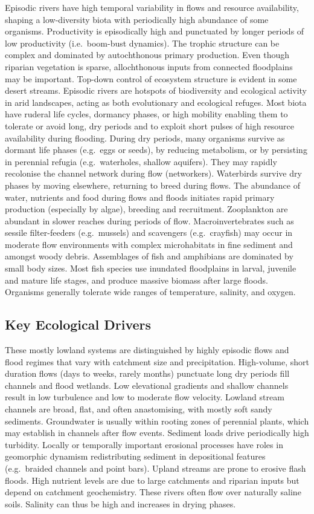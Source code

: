 \documentclass[
  letterpaper,
  DIV=11,
  numbers=noendperiod]{scrartcl}
\begin{document}
Episodic rivers have high temporal variability in flows and resource
availability, shaping a low-diversity biota with periodically high
abundance of some organisms. Productivity is episodically high and
punctuated by longer periods of low productivity (i.e.~boom-bust
dynamics). The trophic structure can be complex and dominated by
autochthonous primary production. Even though riparian vegetation is
sparse, allochthonous inputs from connected floodplains may be
important. Top-down control of ecosystem structure is evident in some
desert streams. Episodic rivers are hotspots of biodiversity and
ecological activity in arid landscapes, acting as both evolutionary and
ecological refuges. Most biota have ruderal life cycles, dormancy
phases, or high mobility enabling them to tolerate or avoid long, dry
periods and to exploit short pulses of high resource availability during
flooding. During dry periods, many organisms survive as dormant life
phases (e.g.~eggs or seeds), by reducing metabolism, or by persisting in
perennial refugia (e.g.~waterholes, shallow aquifers). They may rapidly
recolonise the channel network during flow (networkers). Waterbirds
survive dry phases by moving elsewhere, returning to breed during flows.
The abundance of water, nutrients and food during flows and floods
initiates rapid primary production (especially by algae), breeding and
recruitment. Zooplankton are abundant in slower reaches during periods
of flow. Macroinvertebrates such as sessile filter-feeders
(e.g.~mussels) and scavengers (e.g.~crayfish) may occur in moderate flow
environments with complex microhabitats in fine sediment and amongst
woody debris. Assemblages of fish and amphibians are dominated by small
body sizes. Most fish species use inundated floodplains in larval,
juvenile and mature life stages, and produce massive biomass after large
floods. Organisms generally tolerate wide ranges of temperature,
salinity, and oxygen.

\subsection{Key Ecological Drivers}\label{key-ecological-drivers-5}

These mostly lowland systems are distinguished by highly episodic flows
and flood regimes that vary with catchment size and precipitation.
High-volume, short duration flows (days to weeks, rarely months)
punctuate long dry periods fill channels and flood wetlands. Low
elevational gradients and shallow channels result in low turbulence and
low to moderate flow velocity. Lowland stream channels are broad, flat,
and often anastomising, with mostly soft sandy sediments. Groundwater is
usually within rooting zones of perennial plants, which may establish in
channels after flow events. Sediment loads drive periodically high
turbidity. Locally or temporally important erosional processes have
roles in geomorphic dynamism redistributing sediment in depositional
features (e.g.~braided channels and point bars). Upland streams are
prone to erosive flash floods. High nutrient levels are due to large
catchments and riparian inputs but depend on catchment geochemistry.
These rivers often flow over naturally saline soils. Salinity can thus
be high and increases in drying phases.
\end{document}
